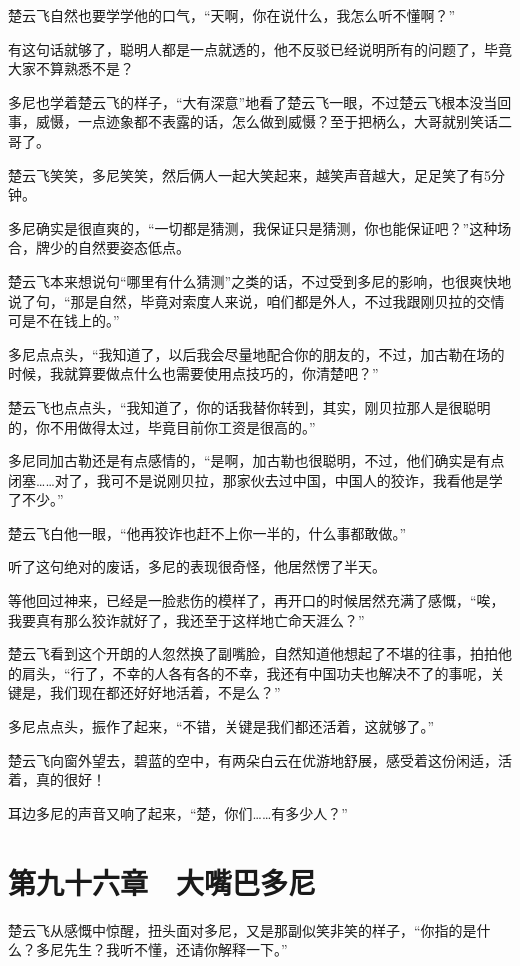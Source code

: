 楚云飞自然也要学学他的口气，“天啊，你在说什么，我怎么听不懂啊？”

有这句话就够了，聪明人都是一点就透的，他不反驳已经说明所有的问题了，毕竟大家不算熟悉不是？

多尼也学着楚云飞的样子，“大有深意”地看了楚云飞一眼，不过楚云飞根本没当回事，威慑，一点迹象都不表露的话，怎么做到威慑？至于把柄么，大哥就别笑话二哥了。

楚云飞笑笑，多尼笑笑，然后俩人一起大笑起来，越笑声音越大，足足笑了有5分钟。

多尼确实是很直爽的，“一切都是猜测，我保证只是猜测，你也能保证吧？”这种场合，牌少的自然要姿态低点。

楚云飞本来想说句“哪里有什么猜测”之类的话，不过受到多尼的影响，也很爽快地说了句，“那是自然，毕竟对索度人来说，咱们都是外人，不过我跟刚贝拉的交情可是不在钱上的。”

多尼点点头，“我知道了，以后我会尽量地配合你的朋友的，不过，加古勒在场的时候，我就算要做点什么也需要使用点技巧的，你清楚吧？”

楚云飞也点点头，“我知道了，你的话我替你转到，其实，刚贝拉那人是很聪明的，你不用做得太过，毕竟目前你工资是很高的。”

多尼同加古勒还是有点感情的，“是啊，加古勒也很聪明，不过，他们确实是有点闭塞……对了，我可不是说刚贝拉，那家伙去过中国，中国人的狡诈，我看他是学了不少。”

楚云飞白他一眼，“他再狡诈也赶不上你一半的，什么事都敢做。”

听了这句绝对的废话，多尼的表现很奇怪，他居然愣了半天。

等他回过神来，已经是一脸悲伤的模样了，再开口的时候居然充满了感慨，“唉，我要真有那么狡诈就好了，我还至于这样地亡命天涯么？”

楚云飞看到这个开朗的人忽然换了副嘴脸，自然知道他想起了不堪的往事，拍拍他的肩头，“行了，不幸的人各有各的不幸，我还有中国功夫也解决不了的事呢，关键是，我们现在都还好好地活着，不是么？”

多尼点点头，振作了起来，“不错，关键是我们都还活着，这就够了。”

楚云飞向窗外望去，碧蓝的空中，有两朵白云在优游地舒展，感受着这份闲适，活着，真的很好！

耳边多尼的声音又响了起来，“楚，你们……有多少人？”

\section{第九十六章　大嘴巴多尼}

楚云飞从感慨中惊醒，扭头面对多尼，又是那副似笑非笑的样子，“你指的是什么？多尼先生？我听不懂，还请你解释一下。”


